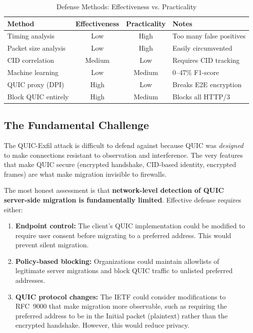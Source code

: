 \documentclass[11pt,a4paper]{article}
\begin{document}
\begin{table}[h]
\centering
\caption{Defense Methods: Effectiveness vs. Practicality}
\begin{tabular}{lccl}
\toprule
\textbf{Method} & \textbf{Effectiveness} & \textbf{Practicality} & \textbf{Notes} \\
\midrule
Timing analysis & Low & High & Too many false positives \\
Packet size analysis & Low & High & Easily circumvented \\
CID correlation & Medium & Low & Requires CID tracking \\
Machine learning & Low & Medium & 0--47\% F1-score \\
QUIC proxy (DPI) & High & Low & Breaks E2E encryption \\
Block QUIC entirely & High & Medium & Blocks all HTTP/3 \\
\bottomrule
\end{tabular}
\end{table}

\subsection{The Fundamental Challenge}

The QUIC-Exfil attack is difficult to defend against because QUIC was \textit{designed} to make connections resistant to observation and interference. The very features that make QUIC secure (encrypted handshake, CID-based identity, encrypted frames) are what make migration invisible to firewalls.

The most honest assessment is that \textbf{network-level detection of QUIC server-side migration is fundamentally limited}. Effective defense requires either:
\begin{enumerate}
    \item \textbf{Endpoint control:} The client's QUIC implementation could be modified to require user consent before migrating to a preferred address. This would prevent silent migration.
    \item \textbf{Policy-based blocking:} Organizations could maintain allowlists of legitimate server migrations and block QUIC traffic to unlisted preferred addresses.
    \item \textbf{QUIC protocol changes:} The IETF could consider modifications to RFC~9000 that make migration more observable, such as requiring the preferred address to be in the Initial packet (plaintext) rather than the encrypted handshake. However, this would reduce privacy.
\end{enumerate}
\end{document}
